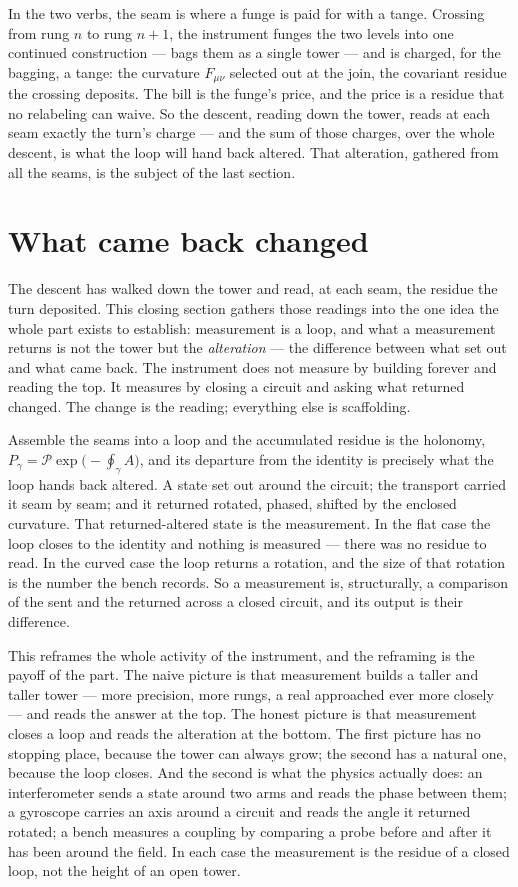 In the two verbs, the seam is where a funge is paid for with a tange. Crossing from rung $n$ to rung $n+1$, the instrument
funges the two levels into one continued construction --- bags them as a single tower --- and is charged, for the bagging, a
tange: the curvature $F_{\mu\nu}$ selected out at the join, the covariant residue the crossing deposits. The bill is the
funge's price, and the price is a residue that no relabeling can waive. So the descent, reading down the tower, reads at each
seam exactly the turn's charge --- and the sum of those charges, over the whole descent, is what the loop will hand back
altered. That alteration, gathered from all the seams, is the subject of the last section.

\section{What came back changed}

The descent has walked down the tower and read, at each seam, the residue the turn deposited. This closing section gathers
those readings into the one idea the whole part exists to establish: measurement is a loop, and what a measurement returns is
not the tower but the \emph{alteration} --- the difference between what set out and what came back. The instrument does not
measure by building forever and reading the top. It measures by closing a circuit and asking what returned changed. The
change is the reading; everything else is scaffolding.

Assemble the seams into a loop and the accumulated residue is the holonomy, $P_\gamma = \mathcal{P}\exp\!\big(\!-\!\oint_
\gamma A\big)$, and its departure from the identity is precisely what the loop hands back altered. A state set out around the
circuit; the transport carried it seam by seam; and it returned rotated, phased, shifted by the enclosed curvature. That
returned-altered state is the measurement. In the flat case the loop closes to the identity and nothing is measured --- there
was no residue to read. In the curved case the loop returns a rotation, and the size of that rotation is the number the bench
records. So a measurement is, structurally, a comparison of the sent and the returned across a closed circuit, and its output
is their difference.

This reframes the whole activity of the instrument, and the reframing is the payoff of the part. The naive picture is that
measurement builds a taller and taller tower --- more precision, more rungs, a real approached ever more closely --- and
reads the answer at the top. The honest picture is that measurement closes a loop and reads the alteration at the bottom. The
first picture has no stopping place, because the tower can always grow; the second has a natural one, because the loop
closes. And the second is what the physics actually does: an interferometer sends a state around two arms and reads the phase
between them; a gyroscope carries an axis around a circuit and reads the angle it returned rotated; a bench measures a
coupling by comparing a probe before and after it has been around the field. In each case the measurement is the residue of a
closed loop, not the height of an open tower.

